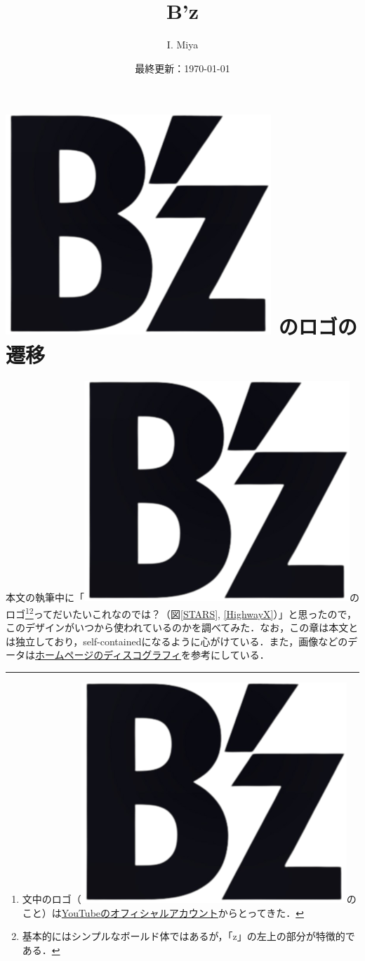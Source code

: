 \documentclass[a4paper,uplatex,dvipdfmx]{jsarticle}
\title{B'z}
\author{I. Miya}
\date{最終更新：\today}
\theoremstyle{definition}
\begin{document}
\section{\texorpdfstring{\includegraphics[width=0.023\linewidth]{fig/Bz/logo.png}}{B'z}%
のロゴの遷移}

本文の執筆中に「\includegraphics[width=0.020\linewidth]{fig/Bz/logo.png}のロゴ\footnote{
  文中のロゴ（\includegraphics[width=0.020\linewidth]{fig/Bz/logo.png}のこと）は\href{https://www.youtube.com/channel/UCpEEcJhBig2GqUFxcXjqiLg}{YouTubeのオフィシャルアカウント}からとってきた．
}\footnote{
  基本的にはシンプルなボールド体ではあるが，「z」の左上の部分が特徴的である．
}ってだいたいこれなのでは？（図\ref{STARS}, \ref{HighwayX}）」と思ったので，このデザインがいつから使われているのかを調べてみた．なお，この章は本文とは独立しており，self-containedになるように心がけている．また，画像などのデータは\href{https://bz-vermillion.com/discography/}{ホームページのディスコグラフィ}を参考にしている．
\end{document}
